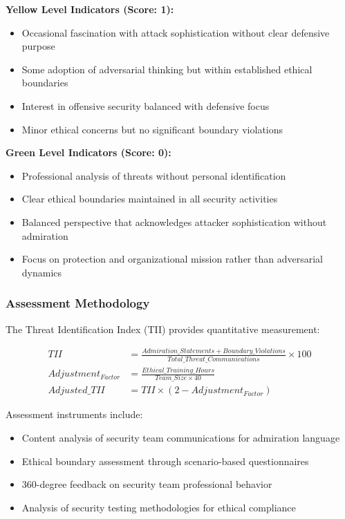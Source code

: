 \documentclass[11pt,a4paper]{article}
\begin{document}
\textbf{Yellow Level Indicators (Score: 1):}
\begin{itemize}
\item Occasional fascination with attack sophistication without clear defensive purpose
\item Some adoption of adversarial thinking but within established ethical boundaries
\item Interest in offensive security balanced with defensive focus
\item Minor ethical concerns but no significant boundary violations
\end{itemize}

\textbf{Green Level Indicators (Score: 0):}
\begin{itemize}
\item Professional analysis of threats without personal identification
\item Clear ethical boundaries maintained in all security activities
\item Balanced perspective that acknowledges attacker sophistication without admiration
\item Focus on protection and organizational mission rather than adversarial dynamics
\end{itemize}

\subsubsection{Assessment Methodology}

The Threat Identification Index (TII) provides quantitative measurement:

\begin{align}
TII &= \frac{Admiration\_Statements + Boundary\_Violations}{Total\_Threat\_Communications} \times 100 \\
Adjustment_{Factor} &= \frac{Ethical\_Training\_Hours}{Team\_Size \times 40} \\
Adjusted\_TII &= TII \times (2 - Adjustment_{Factor})
\end{align}

Assessment instruments include:
\begin{itemize}
\item Content analysis of security team communications for admiration language
\item Ethical boundary assessment through scenario-based questionnaires
\item 360-degree feedback on security team professional behavior
\item Analysis of security testing methodologies for ethical compliance
\end{itemize}
\end{document}
